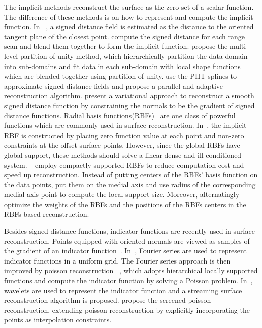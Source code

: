\documentclass[annual]{acmsiggraph}
\begin{document}
The implicit methods reconstruct the surface as the zero set of a scalar function. 
The difference of these methods is on how to represent and compute the implicit function.
In ~\cite{Hoppe-etal-1992}, a signed distance field is estimated as the distance to the oriented
tangent plane of the closest point. \cite{Curless-Levoy-1996} compute the signed distance for each range
scan and blend them together to form the implicit function. \cite{Ohtake-etal-2003} propose the multi-level
partition of unity method, which hierarchically partition the data domain into sub-domains and fit data in
each sub-domain with local shape functions which are blended together using partition of unity. 
\cite{Wang-etal-2011} use the PHT-splines to approximate signed distance fields and propose a parallel and 
adaptive reconstruction algorithm.\cite{Calakli-etal-2011} present a variational approach to reconstruct a smooth signed
distance function by constraining the normals to be the gradient of signed distance functions.
Radial basis functions(RBFs)~\cite{Savchenko-etal-1995} are one class of powerful functions which are commonly used in surface reconstruction.
In~\cite{Turk-O'Brien-1999,Carr-etal-2001,Dinh-etal-2002,Turk-OBrien-2002}, the implicit RBF is constructed by placing zero function value
at each point and non-zero constraints at the offset-surface points. However, since the global RBFs have global support, 
these methods should solve a linear dense and ill-conditioned system. ~\cite{Morse-etal-2001,Kojekine-etal-2003,Ohtake-etal-2003b} employ 
compactly supported RBFs to reduce computation cost and speed up reconstruction. Instead of putting centers of the RBFs'
basis function on the data points, \cite{Samozino-etal-2006} put them on the medial axis and use radius of the corresponding medial axis point
to compute the local support size. Moreover, \cite{Submuth-etal-2010} alternatingly optimize the weights of the RBFs and the positions of the RBFs centers in the RBFs based reconstruction.

Besides signed distance functions, indicator functions are recently used in surface reconstruction. Points equipped with oriented
normals are viewed as samples of the gradient of an indicator function~\cite{Kazhdan-etal-2005,Kazhdan-etal-2006,Manson-etal-2008,Kazhdan-etal-2013}.
In~\cite{Kazhdan-etal-2005}, Fourier series are used to represent indicator functions in a uniform grid. 
The Fourier series approach is then improved by poisson reconstruction ~\cite{Kazhdan-etal-2006}, which adopts hierarchical locally supported 
functions and compute the indicator function by solving a Poisson problem. In~\cite{Manson-etal-2008}, wavelets are used
to represent the indicator function and a streaming surface reconstruction algorithm is proposed. \cite{Kazhdan-etal-2013} propose the
screened poisson reconstruction, extending poisson reconstruction by explicitly incorporating the points as interpolation constraints.
\end{document}
